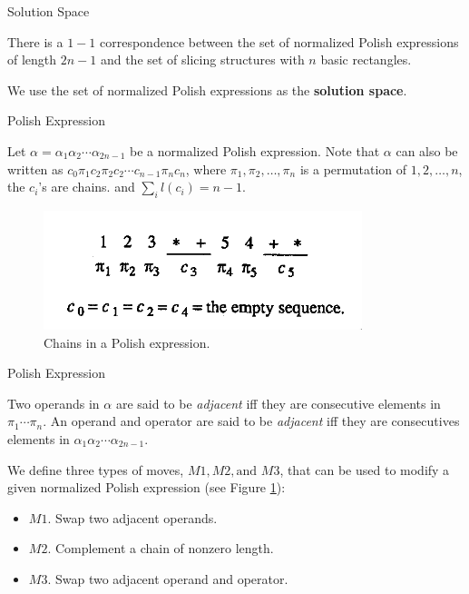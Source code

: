 \documentclass[xcolor=pdftex,dvipsnames,table]{beamer}
\begin{document}
\begin{frame}{Solution Space}
  \begin{theorem}\label{theorem:1}
    There is a $1-1$  correspondence between the set of normalized Polish expressions of length $2n-1$ and the set of slicing structures with $n$ basic rectangles.
  \end{theorem}

  We use the set of normalized Polish expressions as the \textbf{solution space}.
\end{frame}

\begin{frame}{Polish Expression}
  \begin{block}{}
    Let $\alpha = \alpha_1 \alpha_2 \cdots \alpha_{2n-1}$ be a normalized Polish expression. Note that $\alpha$ can also be written as $c_0 \pi_1 c_2 \pi_2 c_2 \cdots c_{n-1} \pi_n c_n$, where $\pi_1, \pi_2, \ldots, \pi_n$ is a permutation of $1,2,\ldots, n$, the $c_i$'s are chains. and $\sum_i l(c_i) = n - 1$.
  \end{block}

  \begin{figure}
    \includegraphics[scale=0.5]{polish_expression}
    \caption{Chains in a Polish expression.}
    \label{fig:3}
  \end{figure}
\end{frame}

\begin{frame}{Polish Expression}
  \begin{block}{}
    Two operands in $\alpha$ are said to be \textit{adjacent} iff they are consecutive elements in $\pi_1 \cdots \pi_n$. An operand and operator are said to be \textit{adjacent} iff they are consecutives elements in $\alpha_1 \alpha_2 \cdots \alpha_{2n-1}$.
  \end{block}
  We define three types of moves, $M1, M2, \text{and } M3$, that can be used to modify a given normalized Polish expression (see Figure \ref{fig:3}):
  \begin{itemize}
      \pause
      \item $M1$. Swap two adjacent operands.
      \pause
      \item $M2$. Complement a chain of nonzero length.
      \pause
      \item $M3$. Swap two adjacent operand and operator.
  \end{itemize}
\end{frame}
\end{document}
